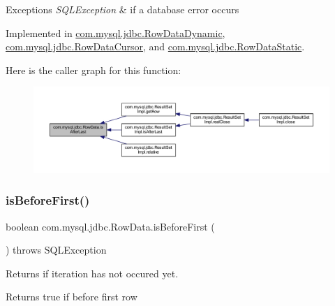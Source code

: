 \begin{DoxyExceptions}{Exceptions}
{\em S\+Q\+L\+Exception} & if a database error occurs \\
\hline
\end{DoxyExceptions}


Implemented in \mbox{\hyperlink{classcom_1_1mysql_1_1jdbc_1_1_row_data_dynamic_aeb4bc5a55d234a0c4af074cd0d32b352}{com.\+mysql.\+jdbc.\+Row\+Data\+Dynamic}}, \mbox{\hyperlink{classcom_1_1mysql_1_1jdbc_1_1_row_data_cursor_a10bcae5f8f9281ca74dae8f107f8ebed}{com.\+mysql.\+jdbc.\+Row\+Data\+Cursor}}, and \mbox{\hyperlink{classcom_1_1mysql_1_1jdbc_1_1_row_data_static_a811d6084ea40248a5e4fb6406f96e404}{com.\+mysql.\+jdbc.\+Row\+Data\+Static}}.

Here is the caller graph for this function\+:
\nopagebreak
\begin{figure}[H]
\begin{center}
\leavevmode
\includegraphics[width=350pt]{interfacecom_1_1mysql_1_1jdbc_1_1_row_data_ab19688b6d0fbdc4e9b7589e099f28ff7_icgraph}
\end{center}
\end{figure}
\mbox{\label{interfacecom_1_1mysql_1_1jdbc_1_1_row_data_ae315d5317b29387492173d1e808b65d5}} 
\subsubsection{\texorpdfstring{is\+Before\+First()}{isBeforeFirst()}}
{\footnotesize\ttfamily boolean com.\+mysql.\+jdbc.\+Row\+Data.\+is\+Before\+First (\begin{DoxyParamCaption}{ }\end{DoxyParamCaption}) throws S\+Q\+L\+Exception}

Returns if iteration has not occured yet.

\begin{DoxyReturn}{Returns}
true if before first row 
\end{DoxyReturn}


